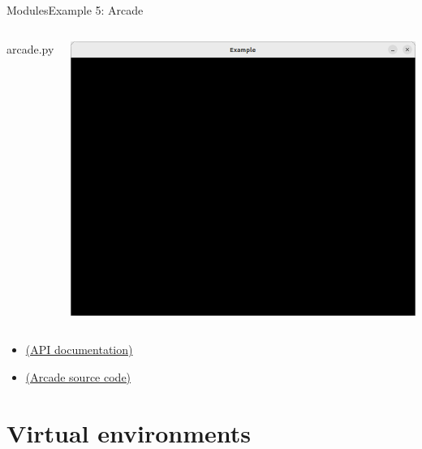 \documentclass[10pt,compress]{beamer} %
\begin{document}
\begin{frame}{Modules}{Example 5: Arcade}
	\begin{columns}

		\vspace{-0.2cm}
		\begin{exampleblock}{arcade.py}
		\vspace{-0.2cm}
		
		\vspace{-0.2cm}
		\end{exampleblock}

		\vspace{-0.2cm}
		\centering \includegraphics[width=\linewidth]{figs/window.png}\\
		\vspace{-0.2cm}
	\end{columns}

	\begin{itemize}
		\item \href{https://api.arcade.academy/en/latest/arcade.html}{(API documentation)}
		\item \href{https://github.com/pythonarcade/arcade/tree/development}{(Arcade source code)}
	\end{itemize}
\end{frame}

\section{Virtual environments}
\end{document}
